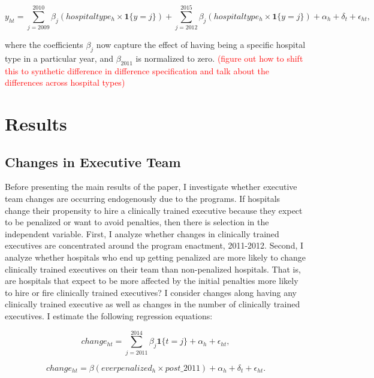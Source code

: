 \documentclass[12pt]{article}
\begin{document}
    \begin{equation}
    \label{eq:es}
    y_{ht} = \sum_{j=2009}^{2010}\beta_j(hospitaltype_{h} \times \mathbf{1}\{y=j\}) + \sum_{j=2012}^{2015}\beta_j (hospitaltype_{h} \times \mathbf{1}\{y=j\}) + \alpha_{h} + \delta_t + \epsilon_{ht},
    \end{equation}

    \noindent  where the coefficients $\beta_j$ now capture the effect of having being a specific hospital type in a particular year, and $\beta_{2011}$ is normalized to zero. \textcolor{red}{(figure out how to shift this to synthetic difference in difference specification and talk about the differences across hospital types)}


    \section{Results}

    \subsection{Changes in Executive Team}\label{sec:endog}

    Before presenting the main results of the paper, I investigate whether executive team changes are occurring endogenously due to the programs. If hospitals change their propensity to hire a clinically trained executive because they expect to be penalized or want to avoid penalties, then there is selection in the independent variable. First, I analyze whether changes in clinically trained executives are concentrated around the program enactment, 2011-2012. Second, I analyze whether hospitals who end up getting penalized are more likely to change clinically trained executives on their team than non-penalized hospitals. That is, are hospitals that expect to be more affected by the initial penalties more likely to hire or fire clinically trained executives? I consider changes along having any clinically trained executive as well as changes in the number of clinically trained executives. I estimate the following regression equations:

    \begin{equation}
    change_{ht} = \sum_{j=2011}^{2014}\beta_j\mathbf{1}\{t=j\} + \alpha_h + \epsilon_{ht},
    \end{equation}

    \begin{equation}
    change_{ht} = \beta(everpenalized_{h} \times post\_2011)+ \alpha_h + \delta_t + \epsilon_{ht}.
    \end{equation}
\end{document}
